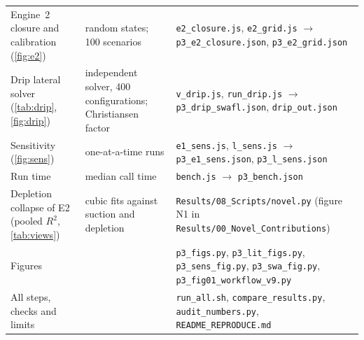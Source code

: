 \begin{table}[H]
\begin{tabularx}{\textwidth}{>{\raggedright\arraybackslash}p{4.2cm}>{\raggedright\arraybackslash}p{3.6cm}X}
Engine~2 closure and calibration (\cref{fig:e2}) & 60 random states; 100 scenarios & \texttt{e2\_closure.js}, \texttt{e2\_grid.js} $\to$ \texttt{p3\_e2\_closure.json}, \texttt{p3\_e2\_grid.json}\\
Drip lateral solver (\cref{tab:drip}, \cref{fig:drip}) & independent solver, 400 configurations; Christiansen factor & \texttt{v\_drip.js}, \texttt{run\_drip.js} $\to$ \texttt{p3\_drip\_swafl.json}, \texttt{drip\_out.json}\\
Sensitivity (\cref{fig:sens}) & one-at-a-time runs & \texttt{e1\_sens.js}, \texttt{l\_sens.js} $\to$ \texttt{p3\_e1\_sens.json}, \texttt{p3\_l\_sens.json}\\
Run time & median call time & \texttt{bench.js} $\to$ \texttt{p3\_bench.json}\\
Depletion collapse of E2 (pooled $R^2$, \cref{tab:views}) & cubic fits against suction and depletion & \texttt{Results/08\_Scripts/novel.py} (figure N1 in \texttt{Results/00\_Novel\_Contributions})\\
Figures & & \texttt{p3\_figs.py}, \texttt{p3\_lit\_figs.py}, \texttt{p3\_sens\_fig.py}, \texttt{p3\_swa\_fig.py}, \texttt{p3\_fig01\_workflow\_v9.py}\\
All steps, checks and limits & & \texttt{run\_all.sh}, \texttt{compare\_results.py}, \texttt{audit\_numbers.py}, \texttt{README\_REPRODUCE.md}\\\bottomrule
\end{tabularx}
\end{table}



